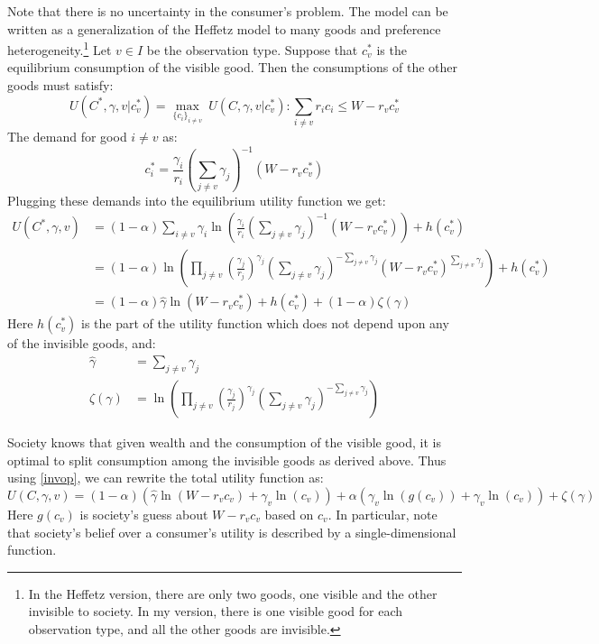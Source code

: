 \documentclass{article}
\begin{document}
Note that there is no uncertainty in the consumer's problem.
The model can be written as a generalization of the Heffetz model to many goods and preference heterogeneity.\footnote{ In the Heffetz version, there are only two goods, one visible and the other invisible to society. In my version, there is one visible good for each observation type, and all the other goods are invisible.}
Let $v\in I$ be the observation type.
Suppose that $c_v^*$ is the equilibrium consumption of the visible good.
Then the consumptions of the other goods must satisfy:
\[ U(C^*,\gamma,v|c_v^*)=\underset{\{c_i\}_{i\neq v}}{\max} \ U(C,\gamma,v|c_v^*) :  \sum_{i \neq v} r_i c_i \le W-r_v c_v^*\]
The demand for good $i\neq v$ as:
\[ c_i^* = \frac{\gamma_i}{r_i}\left(\sum_{j\neq v} \gamma_j\right)^{-1}\left(W-r_v c_v^* \right)\]
Plugging these demands into the equilibrium utility function we get:
\begin{align}
	U(C^*,\gamma,v) &= (1-\alpha)\sum_{i\neq v} \gamma_i \ln\left(\frac{\gamma_i}{r_i}\left(\sum_{j\neq v} \gamma_j\right)^{-1}\left(W-r_v c_v^* \right)\right) + h(c_v^*) \nonumber \\ 
	&= (1-\alpha) \ln\left(\prod_{j\neq v} \left(\frac{\gamma_j}{r_j}\right)^{\gamma_j}\left(\sum_{j\neq v} \gamma_j\right)^{-\sum_{j\neq v} \gamma_j}\left(W-r_v c_v^* \right)^{\sum_{j\neq v} \gamma_j}\right) + h(c_v^*) \nonumber \\ 
	\label{invop}
	&= (1-\alpha) \hat{\gamma} \ln \left(W-r_v c_v^*\right) + h(c_v^*) + (1-\alpha) \zeta(\gamma) 
\end{align}
Here $h(c_v^*)$ is the part of the utility function which does not depend upon any of the invisible goods, and:
\begin{align*}
	\hat{\gamma} &= \sum_{j\neq v} \gamma_j\\
	\zeta(\gamma) & = \ln\left(\prod_{j\neq v} \left(\frac{\gamma_j}{r_j}\right)^{\gamma_j}\left(\sum_{j\neq v} \gamma_j\right)^{-\sum_{j\neq v} \gamma_j}\right) 
\end{align*}

Society knows that given wealth and the consumption of the visible good, it is optimal to split consumption among the invisible goods as derived above.  Thus using \eqref{invop}, we can rewrite the total utility function as: 
\[U(C,\gamma,v) = (1-\alpha) \left(\hat{\gamma} \ln \left(W-r_v c_v\right) + \gamma_v \ln \left(c_v \right)\right) + \alpha \left(\gamma_v \ln \left(g(c_v)\right) + \gamma_v \ln \left(c_v\right) \right) + \zeta(\gamma)\]
Here $g(c_v)$ is society's guess about $W-r_v c_v$ based on $c_v$. 
In particular, note that society's belief over a consumer's utility is described by a single-dimensional function.
\end{document}
